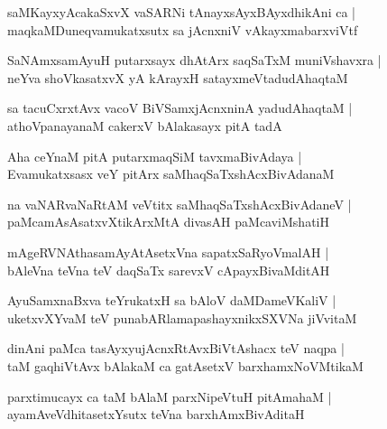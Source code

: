 \begin{shloka}
saMKayxyAcakaSxvX vaSARNi tAnayxsAyxBAyxdhikAni ca |\\
maqkaMDuneqvamukatxsutx sa jAcnxniV vAkayxmabarxviVtf
\end{shloka}

\begin{shloka}
SaNAmxsamAyuH putarxsayx dhAtArx saqSaTxM muniVshavxra |\\
neYva shoVkasatxvX yA kArayxH satayxmeVtadudAhaqtaM 
\end{shloka}

\begin{shloka}
sa tacuCxrxtAvx vacoV BiVSamxjAcnxninA yadudAhaqtaM |\\
athoVpanayanaM cakerxV bAlakasayx pitA tadA 
\end{shloka}

\begin{shloka}
Aha ceYnaM pitA putarxmaqSiM tavxmaBivAdaya |\\
Evamukatxsasx veY pitArx saMhaqSaTxshAcxBivAdanaM 
\end{shloka}

\begin{shloka}
na vaNARvaNaRtAM veVtitx saMhaqSaTxshAcxBivAdaneV |\\
paMcamAsAsatxvXtikArxMtA divasAH paMcaviMshatiH
\end{shloka}

\begin{shloka}
mAgeRVNAthasamAyAtAsetxVna sapatxSaRyoVmalAH |\\
bAleVna teVna teV daqSaTx sarevxV cApayxBivaMditAH
\end{shloka}

\begin{shloka}
AyuSamxnaBxva teYrukatxH sa bAloV daMDameVKaliV |\\
uketxvXYvaM teV punabARlamapashayxnikxSXVNa jiVvitaM
\end{shloka}

\begin{shloka}
dinAni paMca tasAyxyujAcnxRtAvxBiVtAshacx teV naqpa |\\
taM gaqhiVtAvx bAlakaM ca gatAsetxV barxhamxNoVMtikaM
\end{shloka}

\begin{shloka}
parxtimucayx ca taM bAlaM parxNipeVtuH pitAmahaM |\\
ayamAveVdhitasetxYsutx teVna barxhAmxBivAditaH
\end{shloka}

